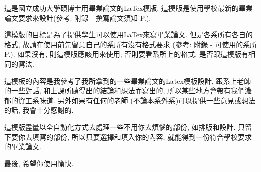 \StartAbstract

這是國立成功大學碩博士用畢業論文的LaTex模版. 這模版是使用學校最新的畢業論文要求來設計(參考: 附錄 - 撰寫論文須知 P.\pageref{appendix:thesis-spec}).

這模版的目標是為了提供學生可以使用LaTex來寫畢業論文. 但是各系所有各自的格式, 故請在使用前先留意自己的系所有沒有格式要求 (參考: 附錄 - 可使用的系所 P.\pageref{appendix:acceptable-dept}). 如果沒有, 則這模版應該用來使用; 否則要看系所上的格式, 是否跟這模版有相同的寫法.

這模板的內容是我參考了我所拿到的一些畢業論文的Latex模板設計, 跟系上老師的一些對話, 和上課所聽得出的結論和想法而寫出的, 所以某些地方會帶有我們濃郁的資工系味道. 另外如果有任何的老師 (不論本系外系)可以提供一些意見或想法的話, 我會十分感謝的.

這模版盡量以全自動化方式去處理一些不用你去煩惱的部份, 如排版和設計. 只留下要你去填寫的部份, 所以只要選擇和填入你的內容, 就能得到一份符合學校要求的畢業論文.

最後, 希望你使用愉快.

\EndAbstract
